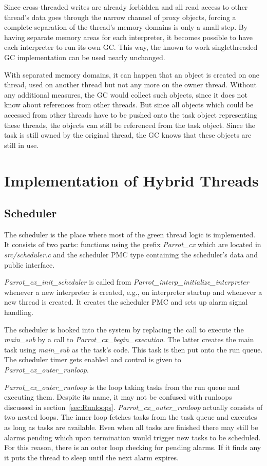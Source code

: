 \documentclass[bachelor,english]{hgbthesis}
\begin{document}
Since cross-threaded writes are already forbidden and all read access to other thread's data goes through the narrow channel of proxy objects, forcing a complete separation of the thread's memory domains is only a small step. By having separate memory areas for each interpreter, it becomes possible to have each interpreter to run its own GC. This way, the known to work singlethreaded GC implementation can be used nearly unchanged.

With separated memory domains, it can happen that an object is created on one thread, used on another thread but not any more on the owner thread. Without any additional measures, the GC would collect such objects, since it does not know about references from other threads. But since all objects which could be accessed from other threads have to be pushed onto the task object representing these threads, the objects can still be referenced from the task object. Since the task is still owned by the original thread, the GC knows that these objects are still in use.

\chapter{Implementation of Hybrid Threads}

\section{Scheduler}

The scheduler is the place where most of the green thread logic is implemented. It consists of two parts: functions using the prefix \textit{Parrot\_cx} which are located in \textit{src/scheduler.c} and the scheduler PMC type containing the scheduler's data and public interface.

\textit{Parrot\_cx\_init\_scheduler} is called from \textit{Parrot\_interp\_initialize\_interpreter} whenever a new interpreter is created, e.g., on interpreter startup and whenever a new thread is created. It creates the scheduler PMC and sets up alarm signal handling.

The scheduler is hooked into the system by replacing the call to execute the \textit{main\_sub} by a call to \textit{Parrot\_cx\_begin\_execution}. The latter creates the main task using \textit{main\_sub} as the task's code. This task is then put onto the run queue. The scheduler timer gets enabled and control is given to \textit{Parrot\_cx\_outer\_runloop}.

\textit{Parrot\_cx\_outer\_runloop} is the loop taking tasks from the run queue and executing them. Despite its name, it may not be confused with runloops discussed in section~\ref{sec:Runloops}. \textit{Parrot\_cx\_outer\_runloop} actually consists of two nested loops. The inner loop fetches tasks from the task queue and executes as long as tasks are available. Even when all tasks are finished there may still be alarms pending which upon termination would trigger new tasks to be scheduled. For this reason, there is an outer loop checking for pending alarms. If it finds any it puts the thread to sleep until the next alarm expires.
\end{document}
